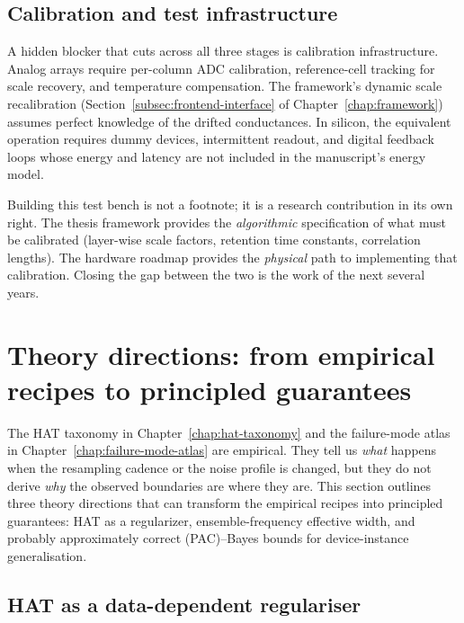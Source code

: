 \subsection{Calibration and test infrastructure}
\label{subsec:calibration-infra}

A hidden blocker that cuts across all three stages is calibration infrastructure.  Analog arrays require per-column ADC calibration, reference-cell tracking for scale recovery, and temperature compensation.  The framework's dynamic scale recalibration (Section~\ref{subsec:frontend-interface} of Chapter~\ref{chap:framework}) assumes perfect knowledge of the drifted conductances.  In silicon, the equivalent operation requires dummy devices, intermittent readout, and digital feedback loops whose energy and latency are not included in the manuscript's energy model.

Building this test bench is not a footnote; it is a research contribution in its own right.  The thesis framework provides the \emph{algorithmic} specification of what must be calibrated (layer-wise scale factors, retention time constants, correlation lengths).  The hardware roadmap provides the \emph{physical} path to implementing that calibration.  Closing the gap between the two is the work of the next several years.


\section{Theory directions: from empirical recipes to principled guarantees}
\label{sec:theory-directions}

The HAT taxonomy in Chapter~\ref{chap:hat-taxonomy} and the failure-mode atlas in Chapter~\ref{chap:failure-mode-atlas} are empirical.  They tell us \emph{what} happens when the resampling cadence or the noise profile is changed, but they do not derive \emph{why} the observed boundaries are where they are.  This section outlines three theory directions that can transform the empirical recipes into principled guarantees: HAT as a regularizer, ensemble-frequency effective width, and probably approximately correct (PAC)--Bayes bounds for device-instance generalisation.

\subsection{HAT as a data-dependent regulariser}
\label{subsec:hat-regularizer}

